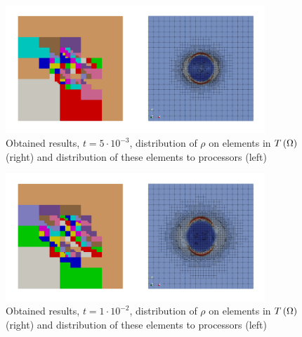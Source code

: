 \begin{figure}[H]
	\begin{center}
		\includegraphics[width=0.87\textwidth]{img/mhd-blast/old/mya2.jpg}
	\caption{Obtained results, $t = 5\cdot 10^{-3}$, distribution of $\rho$ on elements in $T\left(\Omega\right)$ (right) and distribution of these elements to processors (left)}
	\label{figure:blastOldMyAdapt2}
	\end{center}
\end{figure}
\vspace{-8mm}

\begin{figure}[H]
	\begin{center}
		\includegraphics[width=0.87\textwidth]{img/mhd-blast/old/mya3.jpg}
	\caption{Obtained results, $t = 1\cdot 10^{-2}$, distribution of $\rho$ on elements in $T\left(\Omega\right)$ (right) and distribution of these elements to processors (left)}
	\label{figure:blastOldMyAdapt3}
	\end{center}
\end{figure}
\vspace{-8mm}

